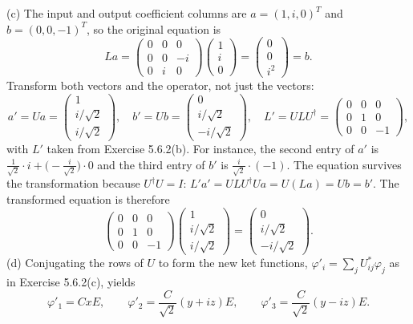 (c) The input and output coefficient columns are $a=(1,i,0)^T$ and
$b=(0,0,-1)^T$, so the original equation is
\[
La=\begin{pmatrix}0&0&0\\0&0&-i\\0&i&0\end{pmatrix}
\begin{pmatrix}1\\i\\0\end{pmatrix}
=\begin{pmatrix}0\\0\\i^2\end{pmatrix}=b.
\]
Transform both vectors and the operator, not just the vectors:
\[
a'=Ua=\begin{pmatrix}1\\i/\sqrt2\\i/\sqrt2\end{pmatrix},\quad
b'=Ub=\begin{pmatrix}0\\i/\sqrt2\\-i/\sqrt2\end{pmatrix},\quad
L'=ULU^\dagger=\begin{pmatrix}0&0&0\\0&1&0\\0&0&-1\end{pmatrix},
\]
with $L'$ taken from Exercise 5.6.2(b). For instance, the second entry
of $a'$ is $\frac1{\sqrt2}\cdot i+\bigl(-\frac i{\sqrt2}\bigr)\cdot0$ and
the third entry of $b'$ is $\frac i{\sqrt2}\cdot(-1)$. The equation
survives the transformation because $U^\dagger U=I$:
$L'a'=ULU^\dagger Ua=U(La)=Ub=b'$.
The transformed equation is therefore
\[
\boxed{\begin{pmatrix}0&0&0\\0&1&0\\0&0&-1\end{pmatrix}
\begin{pmatrix}1\\i/\sqrt2\\i/\sqrt2\end{pmatrix}
=\begin{pmatrix}0\\i/\sqrt2\\-i/\sqrt2\end{pmatrix}.}
\]
(d) Conjugating the rows of $U$ to form the new ket functions,
$\varphi'_i=\sum_jU_{ij}^*\varphi_j$ as in Exercise 5.6.2(c), yields
\[
\varphi'_1=CxE,\qquad
\varphi'_2=\frac C{\sqrt2}(y+iz)E,\qquad
\varphi'_3=\frac C{\sqrt2}(y-iz)E.
\]
